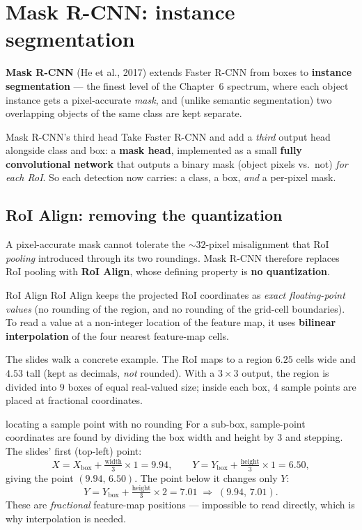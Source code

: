 \documentclass{report}
\begin{document}
\section{Mask R-CNN: instance segmentation}

\textbf{Mask R-CNN} (He et al., 2017) extends Faster R-CNN from boxes to
\textbf{instance segmentation} --- the finest level of the Chapter~6 spectrum,
where each object instance gets a pixel-accurate \emph{mask}, and (unlike
semantic segmentation) two overlapping objects of the same class are kept
separate.

\begin{defbox}{Mask R-CNN's third head}
Take Faster R-CNN and add a \emph{third} output head alongside class and box:
a \textbf{mask head}, implemented as a small \textbf{fully convolutional
network} that outputs a binary mask (object pixels vs.\ not) \emph{for each
RoI}. So each detection now carries: a class, a box, \emph{and} a per-pixel
mask.
\end{defbox}

\subsection{RoI Align: removing the quantization}

A pixel-accurate mask cannot tolerate the $\sim\!32$-pixel misalignment that
RoI \emph{pooling} introduced through its two roundings. Mask R-CNN therefore
replaces RoI pooling with \textbf{RoI Align}, whose defining property is
\textbf{no quantization}.

\begin{defbox}{RoI Align}
RoI Align keeps the projected RoI coordinates as \emph{exact floating-point
values} (no rounding of the region, and no rounding of the grid-cell
boundaries). To read a value at a non-integer location of the feature map, it
uses \textbf{bilinear interpolation} of the four nearest feature-map cells.
\end{defbox}

The slides walk a concrete example. The RoI maps to a region $6.25$ cells wide
and $4.53$ tall (kept as decimals, \emph{not} rounded). With a $3\times3$
output, the region is divided into $9$ boxes of equal real-valued size; inside
each box, $4$ sample points are placed at fractional coordinates.

\begin{exbox}{locating a sample point with no rounding}
For a sub-box, sample-point coordinates are found by dividing the box width and
height by $3$ and stepping. The slides' first (top-left) point:
\[
X = X_{\text{box}} + \tfrac{\text{width}}{3}\times 1 = 9.94,
\qquad
Y = Y_{\text{box}} + \tfrac{\text{height}}{3}\times 1 = 6.50,
\]
giving the point $(9.94,\,6.50)$. The point below it changes only $Y$:
\[
Y = Y_{\text{box}} + \tfrac{\text{height}}{3}\times 2 = 7.01
\;\Rightarrow\; (9.94,\,7.01).
\]
These are \emph{fractional} feature-map positions --- impossible to read
directly, which is why interpolation is needed.
\end{exbox}
\end{document}
